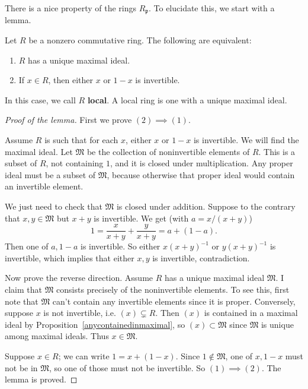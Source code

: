 There is a nice property of the rings $R_{\mathfrak{p}}$. To elucidate this,
we start with a lemma.

\begin{lemma} 
Let $R$ be a nonzero commutative ring. The following are equivalent:
\begin{enumerate}
\item  $R$ has a unique maximal ideal.
\item If $x \in R$, then either $x$ or $1-x$ is invertible.
\end{enumerate}
\end{lemma} 

\begin{definition} 
In this case, we call $R$ \textbf{local}.  A local ring is one with a unique
maximal ideal.  
\end{definition} 

\begin{proof}[Proof of the lemma] 
First we prove $(2) \implies (1)$.

Assume $R$ is such that for
each $x$, either $x$ or $1-x$ is invertible.  We will find the maximal ideal.
Let $\mathfrak{M} $ be the collection of noninvertible elements of $R$. This is
a subset of $R$, not containing $1$,  and it is closed under multiplication.
Any proper ideal must be a subset of $\mathfrak{M}$, because otherwise that
proper ideal would contain an invertible element.  

We just need to check that $\mathfrak{M}$ is closed under addition.  Suppose to the
contrary that $x, y \in \mathfrak{M}$ but $x+y$ is invertible.   We get (with
$a = x/(x+y)$)
\[ 1 = \frac{x}{x+y} + \frac{y}{x+y} =a+(1-a). \]
Then one of $a,1-a$ is invertible. So either $x(x+y)^{-1}$  or $y(x+y)^{-1}$ is
invertible, which implies that either $x,y$ is invertible, contradiction.

Now prove the reverse direction. Assume $R$ has a unique maximal ideal
$\mathfrak{M}$.  I claim that $\mathfrak{M}$ consists precisely of the
noninvertible elements.  To see this, first note that $\mathfrak{M}$
can't contain any invertible elements since it is proper.  Conversely, suppose
$x$ is not invertible, i.e. $(x) \subsetneq R$.  Then $(x)$ is contained in a
maximal ideal by Proposition~\ref{anycontainedinmaximal},  so $(x) \subset
\mathfrak{M}$ since $\mathfrak{M}$ is unique among maximal ideals.
Thus $x \in \mathfrak{M}$.  

Suppose $x \in R$; we can write $1 = x + (1-x)$. Since $1 \notin \mathfrak{M}$,
one of $x, 1-x$ must not be in $\mathfrak{M}$, so one of those must not be
invertible. So $(1) \implies (2)$.   The lemma is proved.
\end{proof} 

